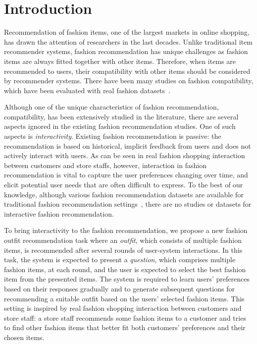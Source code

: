 \chapter{Introduction}
\label{sq:Introduction}

Recommendation of fashion items, one of the largest markets in online shopping, has drawn the attention of researchers in the last decades.
Unlike traditional item recommender systems, fashion recommendation has unique challenges as fashion items are always fitted together with other items.
Therefore, when items are recommended to users, 
their compatibility with other items should be considered by recommender systems.
There have been many studies on fashion compatibility, which have been evaluated with real fashion datasets~\cite{chen2019pog, lin2020outfitnet, li2020hierarchical, verma2020addressing}. 

Although one of the unique characteristics of fashion recommendation, compatibility, has been extensively studied in the literature, there are several aspects ignored in the existing fashion recommendation studies. 
One of such aspects is {\it interactivity}. 
Existing fashion recommendation is passive:
the recommendation is based on historical, implicit feedback from users and does not actively interact with users. 
As can be seen in real fashion shopping interaction between customers and store staffs, 
however,
interaction in fashion recommendation is vital to capture the user preferences changing over time, and elicit potential user needs that are often difficult to express.
To the best of our knowledge, although various fashion recommendation datasets are available for traditional fashion recommendation settings~\cite{liu2016mvc, chen2019pog, han2017learning}, there are no studies or datasets for interactive fashion recommendation.

To bring interactivity to the fashion recommendation, we propose a new fashion outfit recommendation task 
where an {\it outfit}, which consists of multiple fashion items, is recommended after several rounds of user-system interactions.
In this task, the system is expected to present a {\it question}, which comprises multiple fashion items, at each round, and the user is expected to select the best fashion item from the presented items. 
The system is required to learn users' preferences based on their responses gradually and to generate 
subsequent questions for recommending a suitable outfit based on the users' selected fashion items. 
This setting is inspired by real fashion shopping interaction between customers and store staff: 
a store staff recommends some fashion items to a customer
and tries to find other fashion items that better fit both customers' preferences and their chosen items.


